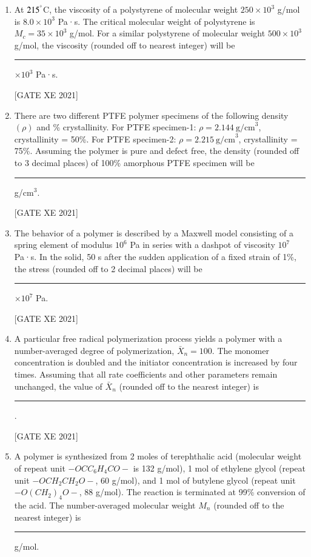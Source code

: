 \documentclass[journal,12pt,onecolumn]{IEEEtran}
\theoremstyle{remark}
\begin{document}
\begin{enumerate}[resume]
\hfill[GATE XE 2021]


\item At $215^\degree$C, the viscosity of a polystyrene of molecular weight $250\times10^3$ g/mol is $8.0\times10^3$ Pa·s. The critical molecular weight of polystyrene is $M_c=35\times10^3$ g/mol. For a similar polystyrene of molecular weight $500\times10^3$ g/mol, the viscosity (rounded off to nearest integer) will be \rule{3cm}{0.15mm} $\times10^3$ Pa·s.

\hfill[GATE XE 2021]


\item There are two different PTFE polymer specimens of the following density $(\rho)$ and \% crystallinity. For PTFE specimen-1: $\rho=2.144\ \text{g/cm}^3$, crystallinity = 50\%. For PTFE specimen-2: $\rho=2.215\ \text{g/cm}^3$, crystallinity = 75\%. Assuming the polymer is pure and defect free, the density (rounded off to 3 decimal places) of 100\% amorphous PTFE specimen will be \rule{3cm}{0.15mm} g/cm$^3$.

\hfill[GATE XE 2021]


\item The behavior of a polymer is described by a Maxwell model consisting of a spring element of modulus $10^6$ Pa in series with a dashpot of viscosity $10^7$ Pa·s. In the solid, 50 s after the sudden application of a fixed strain of 1\%, the stress (rounded off to 2 decimal places) will be \rule{3cm}{0.15mm} $\times10^7$ Pa.

\hfill[GATE XE 2021]


\item A particular free radical polymerization process yields a polymer with a number-averaged degree of polymerization, $\bar{X}_n=100$. The monomer concentration is doubled and the initiator concentration is increased by four times. Assuming that all rate coefficients and other parameters remain unchanged, the value of $\bar{X}_n$ (rounded off to the nearest integer) is \rule{3cm}{0.15mm}.

\hfill[GATE XE 2021]


\item A polymer is synthesized from 2 moles of terephthalic acid (molecular weight of repeat unit $-O\!C\!C_6H_4CO-$ is 132 g/mol), 1 mol of ethylene glycol (repeat unit $-OCH_2CH_2O-$, 60 g/mol), and 1 mol of butylene glycol (repeat unit $-O(CH_2)_4O-$, 88 g/mol). The reaction is terminated at 99\% conversion of the acid. The number-averaged molecular weight $M_n$ (rounded off to the nearest integer) is \rule{3cm}{0.15mm} g/mol.


\end{enumerate}
\end{document}
